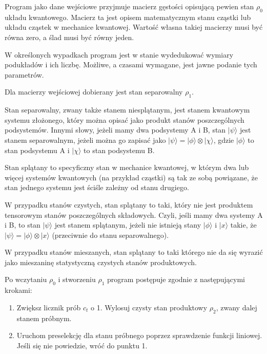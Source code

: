 \documentclass[11pt, a4paper]{article}
\begin{document}
\begin{sloppypar}
    Program jako dane wejściowe przyjmuje macierz gęstości opisującą pewien stan $\rho_{0}$
    układu kwantowego. Macierz ta jest opisem matematycznym stanu cząstki lub układu
    cząstek w mechanice kwantowej. Wartość własna takiej macierzy musi być równa zero, a
    ślad musi być równy jeden.

    W określonych wypadkach program jest w stanie wydedukować wymiary podukładów i ich
    liczbę. Możliwe, a czasami wymagane, jest jawne podanie tych parametrów.

    Dla macierzy wejściowej dobierany jest stan separowalny $\rho_{1}$.

    Stan separowalny, zwany także stanem niesplątanym, jest stanem kwantowym systemu złożonego,
    który można opisać jako produkt stanów poszczególnych podsystemów. Innymi słowy,
    jeżeli mamy dwa podsystemy A i B, stan $|\psi\rangle$ jest stanem separowalnym,
    jeżeli można go zapisać jako $|\psi\rangle = |\phi\rangle \otimes |\chi\rangle$, gdzie
    $| \phi\rangle$ to stan podsystemu A i $|\chi\rangle$ to stan podsystemu B.

    Stan splątany to specyficzny stan w mechanice kwantowej, w którym dwa lub więcej
    systemów kwantowych (na przykład cząstki) są tak ze sobą powiązane, że stan jednego systemu
    jest ściśle zależny od stanu drugiego.

    W przypadku stanów czystych, stan splątany to taki, który nie jest produktem tensorowym
    stanów poszczególnych składowych. Czyli, jeśli mamy dwa systemy A i B, to stan
    $|\psi\rangle$ jest stanem splątanym, jeżeli nie istnieją stany $|\phi\rangle$ i $|x\rangle$
    takie, że $|\psi\rangle = |\phi\rangle \otimes |x\rangle$ (przeciwnie do stanu separowalnego).

    W przypadku stanów mieszanych, stan splątany to taki którego nie da się wyrazić jako mieszaninę statystyczną czystych stanów produktowych.

    Po wczytaniu $\rho_{0}$ i stworzeniu $\rho_{1}$ program postępuje zgodnie z
    następującymi krokami:

    \begin{enumerate}
      \item Zwiększ licznik prób $c_{t}$ o 1. Wylosuj czysty stan produktowy $\rho_{2}$,
        zwany dalej stanem próbnym.

      \item Uruchom preselekcję dla stanu próbnego poprzez sprawdzenie funkcji liniowej.
        Jeśli się nie powiedzie, wróć do punktu 1.


\end{enumerate}
\end{sloppypar}
\end{document}
